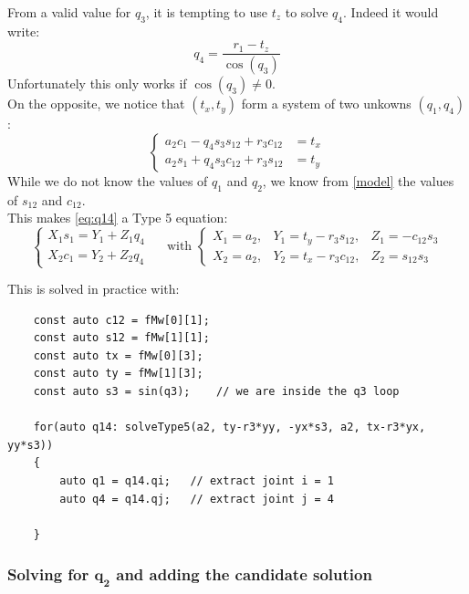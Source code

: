 \documentclass{ecnreport}
\begin{document}
    From a valid value for $q_3$, it is tempting to use $t_z$ to solve $q_4$. Indeed it would write:
    \begin{equation*}
    q_4 = \frac{r_1 - t_z}{\cos(q_3)}
    \end{equation*}Unfortunately this only works if $\cos(q_3) \neq 0$.\\
    On the opposite, we notice that $(t_x, t_y)$ form a system of two unkowns $(q_1, q_4)$:
    \begin{equation}
    \left\{\begin{array}{ll}
            a_{2} c_1 - q_{4} s_3 s_{12} + r_{3} c_{12} &= t_x \\  a_{2} s_1 + q_{4} s_3 c_{12} + r_{3} s_{12} &= t_y
            \end{array}\right.\label{eq:q14}
    \end{equation}While we do not know the values of $q_1$ and $q_2$, we know from \eqref{model} the values of $s_{12}$ and $c_{12}$.\\
    This makes \eqref{eq:q14} a Type 5 equation:
    \begin{equation*}
    \left\{\begin{array}{l}X_1s_1 = Y_1+Z_1q_4 \\ X_2c_1 = Y_2+Z_2q_4\end{array}\right. \quad \text{ with } 
    \left\{\begin{array}{ccc}
        X_1 = a_2, & Y_1 = t_y-r_3s_{12}, & Z_1 =-c_{12}s_3 \\X_2 = a_2, & Y_2 = t_x-r_3c_{12}, & Z_2 = s_{12}s_3
        \end{array}\right.
    \end{equation*}
    
    This is solved in practice with:
    \begin{center}
    \cppstyle \raggedright
    \begin{lstlisting}
    const auto c12 = fMw[0][1];
    const auto s12 = fMw[1][1];
    const auto tx = fMw[0][3];
    const auto ty = fMw[1][3];
    const auto s3 = sin(q3);    // we are inside the q3 loop
    
    for(auto q14: solveType5(a2, ty-r3*yy, -yx*s3, a2, tx-r3*yx, yy*s3))
    {
        auto q1 = q14.qi;   // extract joint i = 1
        auto q4 = q14.qj;   // extract joint j = 4
    
    }
    \end{lstlisting}
\end{center}


\subsubsection*{Solving for $\mathbf{q_2}$ and adding the candidate solution}
\end{document}
